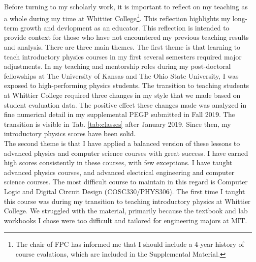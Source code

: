 \documentclass[../../../main.tex]{subfiles}
\begin{document}
Before turning to my scholarly work, it is important to reflect on my teaching as a whole during my time at Whittier College\footnote{The chair of FPC has informed me that I should include a 4-year history of course evalations, which are included in the Supplemental Material.}.  This reflection highlights my long-term growth and devlopment as an educator.  This reflection is intended to provide context for those who have not encountered my previous teaching results and analysis.  There are three main themes.  The first theme is that learning to teach introductory physics courses in my first several semesters required major adjustments.  In my teaching and mentorship roles during my post-doctoral fellowships at The University of Kansas and The Ohio State University, I was exposed to high-performing physics students.  The transition to teaching students at Whittier College required three changes in my style that we made based on student evaluation data.  The positive effect these changes made was analyzed in fine numerical detail in my supplemental PEGP submitted in Fall 2019.  The transition is visible in Tab. \ref{tab:classes} after January 2019. Since then, my introductory physics scores have been solid.
\\
\vspace{0.25cm}
The second theme is that I have applied a balanced version of these lessons to advanced physics and computer science courses with great success.  I have earned high scores consistently in these courses, with few exceptions.  I have taught advanced physics courses, and advanced electrical engineering and computer science courses.  The most difficult course to maintain in this regard is Computer Logic and Digital Circuit Design (COSC330/PHYS306).  The first time I taught this course was during my transition to teaching introductory physics at Whittier College.  We struggled with the material, primarily because the textbook and lab workbooks I chose were too difficult and tailored for engineering majors at MIT.
\\
\vspace{0.25cm}
\end{document}
